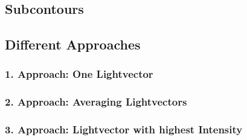 \subsection{Subcontours}\label{sec:subcontours}

\subsection{Different Approaches}\label{sec:approaches}

\subsubsection{1. Approach: One Lightvector}\label{sec:appOne}

\subsubsection{2. Approach: Averaging Lightvectors}\label{sec:appTwo}

\subsubsection{3. Approach: Lightvector with highest Intensity}\label{sec:appThree}


\newpage